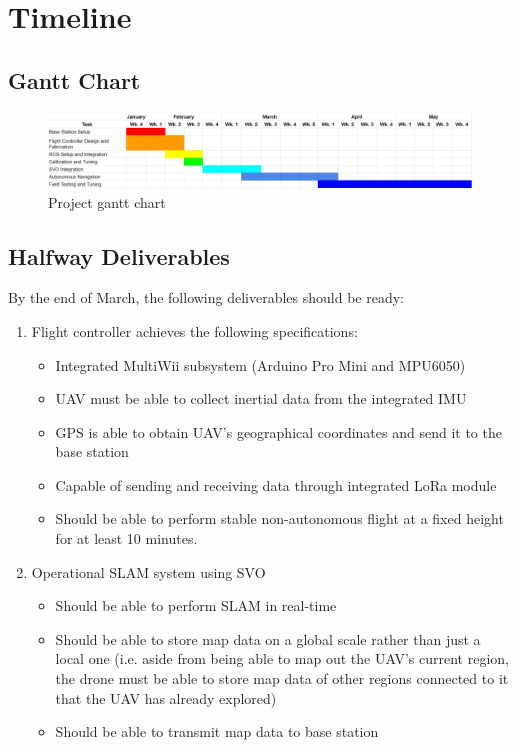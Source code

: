 \documentclass[english]{upeeei}
\begin{document}
\chapter{Timeline}
\section{Gantt Chart}
\begin{figure}[h]
    \centering
    \includegraphics[scale=0.5]{images/gantt_chart.PNG}
    \caption{Project gantt chart}
    \label{fig:gantt_chart}
\end{figure}
\section{Halfway Deliverables}
By the end of March, the following deliverables should be ready:
\begin{enumerate}
    \item Flight controller achieves the following specifications:
    \begin{itemize}
        \item Integrated MultiWii subsystem (Arduino Pro Mini and MPU6050)
        \item UAV must be able to collect inertial data from the integrated IMU
        \item GPS is able to obtain UAV's geographical coordinates and send it to the base station
        \item Capable of sending and receiving data through integrated LoRa module
        \item Should be able to perform stable non-autonomous flight at a fixed height for at least 10 minutes.
    \end{itemize}
    \item Operational SLAM system using SVO
    \begin{itemize}
        \item Should be able to perform SLAM in real-time
        \item Should be able to store map data on a global scale rather than just a local one (i.e. aside from being able
        to map out the UAV's current region, the drone must be able to store map data of other regions connected to it that
        the UAV has already explored)
        \item Should be able to transmit map data to base station
    \end{itemize}
\end{enumerate}
\end{document}
